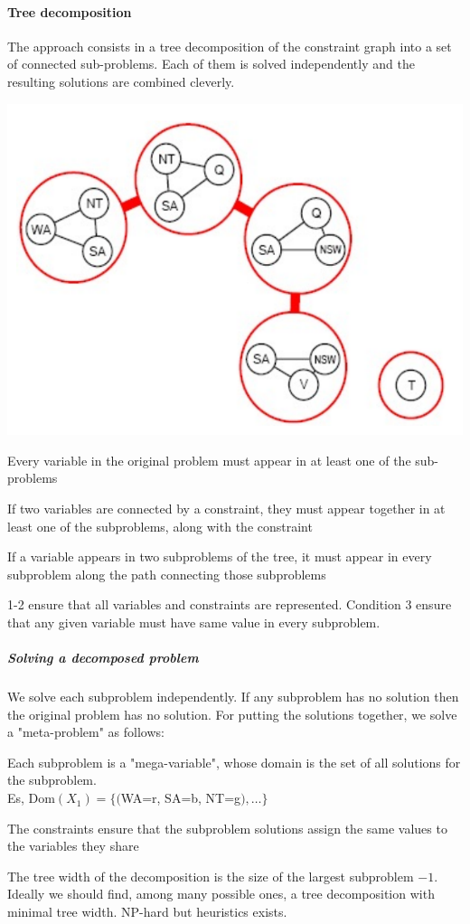 \documentclass[10pt]{report}
\begin{document}
\paragraph{Tree decomposition} The approach consists in a tree decomposition of the constraint graph into a set of connected sub-problems. Each of them is solved independently and the resulting solutions are combined cleverly.
\begin{center}
	\includegraphics[scale=0.5]{10.png}
\end{center}
\begin{list}{}{}
	\item Every variable in the original problem must appear in at least one of the sub-problems
	\item If two variables are connected by a constraint, they must appear together in at least one of the subproblems, along with the constraint
	\item If a variable appears in two subproblems of the tree, it must appear in every subproblem along the path connecting those subproblems
\end{list}
1-2 ensure that all variables and constraints are represented. Condition 3 ensure that any given variable must have same value in every subproblem.
\subparagraph{Solving a decomposed problem} We solve each subproblem independently. If any subproblem has no solution then the original problem has no solution. For putting the solutions together, we solve a "meta-problem" as follows:
\begin{list}{}{}
	\item Each subproblem is a "mega-variable", whose domain is the set of all solutions for the subproblem.\\
	Es, Dom$(X_1) = \{($WA=r, SA=b, NT=g$),\ldots\}$
	\item The constraints ensure that the subproblem solutions assign the same values to the variables they share
\end{list}
The tree width of the decomposition is the size of the largest subproblem $-1$. Ideally we should find, among many possible ones, a tree decomposition with minimal tree width. NP-hard but heuristics exists.
\end{document}
